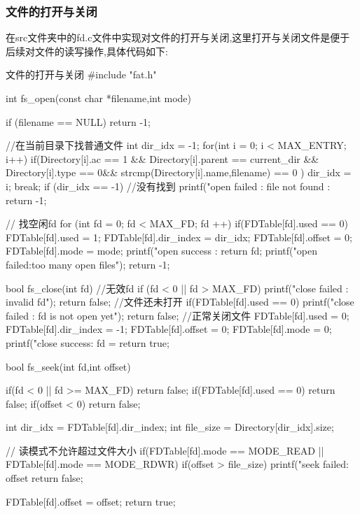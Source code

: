 \subsubsection{文件的打开与关闭}
在src文件夹中的fd.c文件中实现对文件的打开与关闭,这里打开与关闭文件是便于后续对文件的读写操作,具体代码如下:
\begin{ccode}{文件的打开与关闭}
#include "fat.h"

int fs_open(const char *filename,int mode){
    if (filename == NULL) return -1;

    //在当前目录下找普通文件
    int  dir_idx = -1;
    for(int i = 0; i < MAX_ENTRY; i++){
        if(Directory[i].ac == 1 &&
            Directory[i].parent == current_dir &&
            Directory[i].type == 0&&
            strcmp(Directory[i].name,filename) == 0
        ){
            dir_idx = i;
            break;
        }
    }
    if (dir_idx == -1){
        //没有找到
        printf("open failed : file not found : %
        return -1;
    }

    // 找空闲fd
    for (int fd = 0; fd < MAX_FD; fd ++){
        if(FDTable[fd].used == 0){
            FDTable[fd].used = 1;
            FDTable[fd].dir_index = dir_idx;
            FDTable[fd].offset = 0;
            FDTable[fd].mode = mode;
            printf("open success : %
            return fd;
        }  
    }
    printf("open failed:too many open files\n");
    return -1;
}

bool fs_close(int fd){
    //无效fd
    if (fd < 0 || fd > MAX_FD){
        printf("close failed : invalid fd\n");
        return false;
    }
    //文件还未打开
    if(FDTable[fd].used == 0){
        printf("close failed : fd is not open yet\n");
        return false;
    }
    //正常关闭文件
    FDTable[fd].used = 0;
    FDTable[fd].dir_index = -1;
    FDTable[fd].offset = 0;
    FDTable[fd].mode = 0;
    printf("close success: fd = %
    return true;
}

bool fs_seek(int fd,int offset){
    if(fd < 0 || fd >= MAX_FD) return false;
    if(FDTable[fd].used == 0) return false;
    if(offset < 0) return false;

    int dir_idx = FDTable[fd].dir_index;
    int file_size = Directory[dir_idx].size;

    // 读模式不允许超过文件大小
    if(FDTable[fd].mode == MODE_READ || FDTable[fd].mode == MODE_RDWR){
        if(offset > file_size){
            printf("seek failed: offset %
            return false;
        }
    }

    FDTable[fd].offset = offset;
    return true;
}
\end{ccode}
